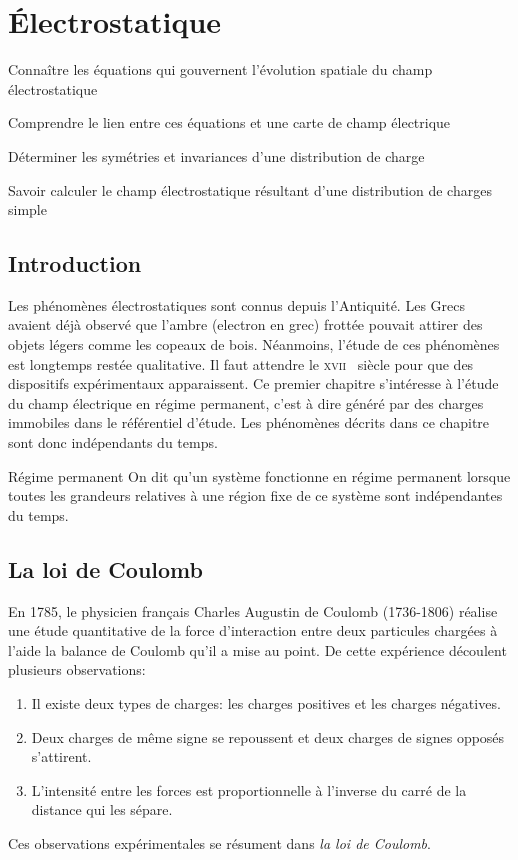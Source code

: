 \chapter{Électrostatique}
\label{chap:electrostatique}
\label{sec:objectifs}
\begin{objectif}
	\item Connaître les équations qui gouvernent l'évolution spatiale 
	  du champ électrostatique 
	\item Comprendre le lien entre ces équations et une carte de champ 
	  électrique
	\item Déterminer les symétries et invariances d'une distribution de charge
	\item Savoir calculer le champ électrostatique résultant d'une 
	  distribution de charges simple
\end{objectif}
\section*{Introduction}%
\label{sec:introduction}
Les phénomènes électrostatiques sont connus depuis l'Antiquité.
Les Grecs avaient déjà observé que l'ambre (electron en grec)
frottée pouvait attirer des objets
légers comme les copeaux de bois.
Néanmoins, l'étude de ces phénomènes est longtemps restée qualitative.
Il faut attendre le \textsc{xvii} \ieme~siècle pour que des dispositifs 
expérimentaux apparaissent.
Ce premier chapitre s'intéresse à l'étude du champ électrique 
en régime permanent, c'est à dire généré par des charges immobiles dans le 
référentiel d'étude. Les phénomènes décrits dans ce chapitre sont 
donc indépendants du temps.

\begin{defn}{Régime permanent}
	On dit qu'un système fonctionne en régime permanent lorsque toutes les
	grandeurs relatives à une région fixe de ce système sont indépendantes 
	du temps.
\end{defn}

\section{La loi de Coulomb}%
\label{sec:interaction_coulombienne}
En 1785,  le physicien français Charles Augustin de Coulomb (1736-1806)
réalise une étude quantitative de la force d'interaction entre deux particules
chargées à l'aide la balance de Coulomb qu'il a mise au point.
De cette expérience découlent plusieurs observations:

\begin{enumerate}
	\item Il existe deux types de charges: les charges positives et les
	  charges négatives.
	\item Deux charges de même signe se repoussent et deux charges de signes
	  opposés s'attirent.
	\item L'intensité entre les forces est proportionnelle à l'inverse 
	  du carré de la distance qui les sépare.
\end{enumerate}
Ces observations expérimentales se résument dans \emph{la loi de Coulomb}. 


